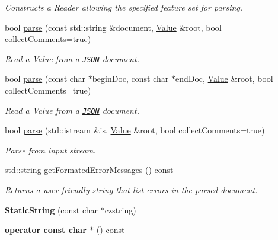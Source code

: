 \begin{DoxyCompactItemize}
\begin{DoxyCompactList}\small\item\em Constructs a Reader allowing the specified feature set for parsing. \end{DoxyCompactList}\item 
bool \hyperlink{protocol_json_1_1_j_s_o_n___a_p_i_ae59036936fda704af5ff0dd27d759d61}{parse} (const std\-::string \&document, \hyperlink{protocol_json_1_1_j_s_o_n___a_p_i_a3a85c4423131080eb9300546d6130dfd}{Value} \&root, bool collect\-Comments=true)
\begin{DoxyCompactList}\small\item\em Read a Value from a \href{http://www.json.org}{\tt J\-S\-O\-N} document. \end{DoxyCompactList}\item 
bool \hyperlink{protocol_json_1_1_j_s_o_n___a_p_i_a30735cd943a02164996275abe1712224}{parse} (const char $\ast$begin\-Doc, const char $\ast$end\-Doc, \hyperlink{protocol_json_1_1_j_s_o_n___a_p_i_a3a85c4423131080eb9300546d6130dfd}{Value} \&root, bool collect\-Comments=true)
\begin{DoxyCompactList}\small\item\em Read a Value from a \href{http://www.json.org}{\tt J\-S\-O\-N} document. \end{DoxyCompactList}\item 
bool \hyperlink{protocol_json_1_1_j_s_o_n___a_p_i_a54923dcea65f8fc8d91f5625e7aa3cc7}{parse} (std\-::istream \&is, \hyperlink{protocol_json_1_1_j_s_o_n___a_p_i_a3a85c4423131080eb9300546d6130dfd}{Value} \&root, bool collect\-Comments=true)
\begin{DoxyCompactList}\small\item\em Parse from input stream. \end{DoxyCompactList}\item 
std\-::string \hyperlink{protocol_json_1_1_j_s_o_n___a_p_i_ad2995c11c6aeb7719af179c0eacb6c85}{get\-Formated\-Error\-Messages} () const 
\begin{DoxyCompactList}\small\item\em Returns a user friendly string that list errors in the parsed document. \end{DoxyCompactList}\item 
\hypertarget{protocol_json_1_1_j_s_o_n___a_p_i_afdc014f5f606d49f78bae1467f6b28d5}{{\bfseries Static\-String} (const char $\ast$czstring)}\label{protocol_json_1_1_j_s_o_n___a_p_i_afdc014f5f606d49f78bae1467f6b28d5}

\item 
\hypertarget{protocol_json_1_1_j_s_o_n___a_p_i_ad2611e5ce83556c555cdc40ef5f52c8e}{{\bfseries operator const char $\ast$} () const }\label{protocol_json_1_1_j_s_o_n___a_p_i_ad2611e5ce83556c555cdc40ef5f52c8e}


\end{DoxyCompactItemize}
